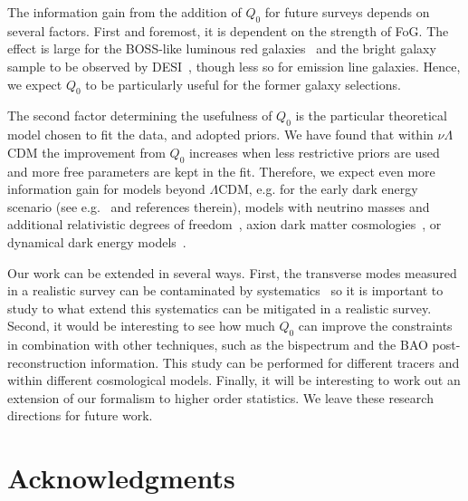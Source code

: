 \documentclass[12pt,a4paper]{article}
\begin{document}
The information gain from the addition of $Q_0$ for future surveys depends on several factors. 
First and foremost, it is dependent on the strength of FoG. 
The effect is large for the BOSS-like luminous red galaxies~\cite{Alam:2016hwk,Ivanov:2019pdj}
and the bright galaxy sample to be observed by DESI~\cite{Aghamousa:2016zmz}, though less so for emission line galaxies. Hence, we expect $Q_0$
to be particularly useful for the former galaxy selections. 


The second factor determining the usefulness of $Q_0$ is the particular theoretical model chosen
to fit the data, and adopted priors. 
We have found that within $\nu\Lambda$CDM the improvement from $Q_0$ increases when less restrictive priors are used and more free parameters are kept in the fit. 
Therefore, we expect even more information gain for models beyond $\Lambda$CDM, e.g. for the early dark energy scenario (see e.g.~\cite{Ivanov:2020ril} and references therein),
models with neutrino masses and additional relativistic degrees of freedom~\cite{Ivanov:2019hqk}, 
axion dark matter cosmologies~\cite{Lague:2021frh}, 
or dynamical dark energy models~\cite{DAmico:2020kxu,Chudaykin:2020ghx}.




Our work can be extended in several ways. 
First, the transverse modes measured in a realistic survey 
can be contaminated by systematics~\cite{Hand:2017irw,Ivanov:2021zmi}
so it is important to study to what extend this systematics can be 
mitigated in a realistic survey.
Second, it would be interesting to see how much $Q_0$ can improve the constraints in combination 
with other techniques, such as the bispectrum and the BAO post-reconstruction information.
This study can be performed for different tracers and within different cosmological models.
Finally, it will be interesting to work out an extension 
of our formalism to higher order statistics.
We leave these research directions for future work.




  
\section*{Acknowledgments}
\end{document}
